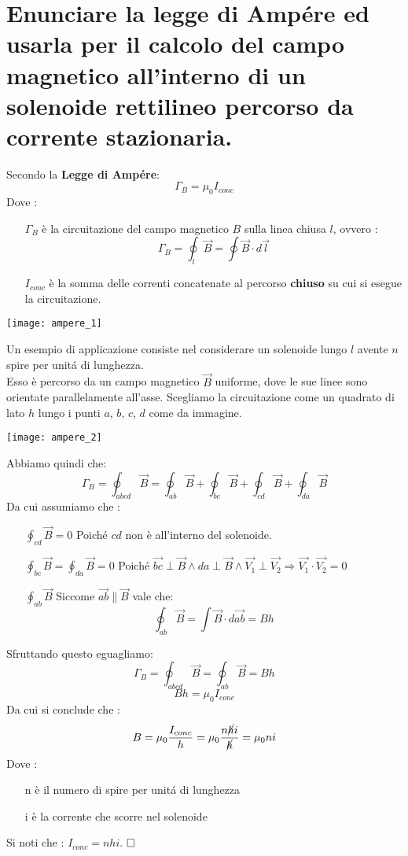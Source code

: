 \section{Enunciare la legge di Amp\'ere ed usarla per il calcolo
	del campo magnetico all'interno di un solenoide rettilineo
	percorso da corrente stazionaria.}
Secondo la \textbf{Legge di Amp\'ere}:
$$
    \Gamma_B = \mu_0 I_{conc}
$$
Dove :
\begin{itemize}
	\item [$\Gamma_B$] {
		\`e la circuitazione del campo magnetico $B$ sulla    linea chiusa $l$, ovvero :
        $$
            \Gamma_B = \oint_l{\vec{B}} = \oint{\vec{B} \cdot d\vec{l}}
        $$
    }
    \item [$I_{conc}$] {
    	\`e la somma delle correnti concatenate al percorso \textbf{chiuso} su cui si esegue la circuitazione.
    }
\end{itemize}
\begin{center}
\texttt{[image: ampere\_1]}
\end{center}

\pagebreak

Un esempio di applicazione consiste nel considerare un solenoide lungo $l$ avente $n$ spire per unit\'a di lunghezza. \\
Esso \`e percorso da un campo magnetico $\vec{B}$ uniforme, dove le sue linee sono orientate parallelamente all'asse. Scegliamo la circuitazione come un quadrato di lato $h$ lungo i punti $a$, $b$, $c$, $d$ come da immagine.
\begin{center}
	\texttt{[image: ampere\_2]}
\end{center}
Abbiamo quindi che:
$$
     \Gamma_B = \oint_{abcd}{\vec{B}} = \oint_{ab}{\vec{B}} + \oint_{bc}{\vec{B}} + \oint_{cd}{\vec{B}} + \oint_{da}{\vec{B}}
$$
Da cui assumiamo che : 
\begin{itemize}
	\item [$\oint_{cd}{\vec{B}} = 0$] {
	    Poich\'e $cd$ non \`e all'interno del solenoide.	
	}
	\item [$\oint_{bc}{\vec{B}} = \oint_{da}{\vec{B}} = 0$] {
		Poich\'e $\vec{bc} \perp \vec{B} \land da \perp \vec{B} \land \vec{V_1} \perp \vec{V_2} \Longrightarrow \vec{V_1} \cdot \vec{V_2} = 0$
	}
	\item [$\oint_{ab}{\vec{B}}$] {
		Siccome $\vec{ab} \parallel \vec{B}$ vale che:
		$$
	        \oint_{ab}{\vec{B}} = \int{\vec{B} \cdot d\vec{ab}} = Bh
		$$
	}
\end{itemize}
Sfruttando questo eguagliamo:
$$
    \Gamma_B = \oint_{abcd}{\vec{B}} = \oint_{ab}{\vec{B}} = Bh
$$
$$
    Bh = \mu_0 I_{conc}
$$
Da cui si conclude che :
$$
    B = \mu_0 \frac{I_{conc}}{h} = \mu_0 \frac{n \cancel{h} i}{\cancel{h}} = \mu_0 n i
$$
Dove : 
\begin{itemize}
	\item [n] {\`e il numero di spire per unit\'a di lunghezza }
	\item [i] {\`e la corrente che scorre nel solenoide}
\end{itemize}
Si noti che : $I_{conc} = n h i$.
$\hfill\square$